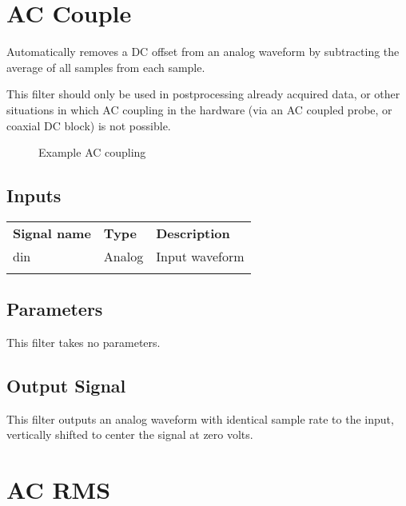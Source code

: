 \pagebreak
\section{AC Couple}
\label{filter:accouple}

Automatically removes a DC offset from an analog waveform by subtracting the average of all samples from each sample.

This filter should only be used in postprocessing already acquired data, or other situations in which AC coupling in
the hardware (via an AC coupled probe, or coaxial DC block) is not possible.

\begin{figure}[h]
\centering
{}
\caption{Example AC coupling}
\end{figure}

\subsection{Inputs}

\begin{tabularx}{16cm}{llX}
\thickhline
\textbf{Signal name} & \textbf{Type} & \textbf{Description} \\
\thickhline
din & Analog & Input waveform \\
\thickhline
\end{tabularx}

\subsection{Parameters}

This filter takes no parameters.

\subsection{Output Signal}

This filter outputs an analog waveform with identical sample rate to the input, vertically shifted to center the signal
at zero volts.

\pagebreak
\section{AC RMS}
\label{filter:acrms}

